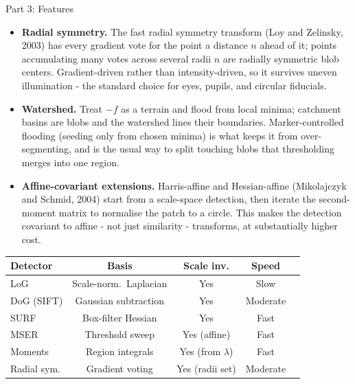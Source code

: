 \documentclass[letterpaper]{article}
\begin{document}
\begin{notes}{Part 3: Features}

\begin{itemize}
    \item \textbf{Radial symmetry.} The fast radial symmetry transform (Loy and Zelinsky, 2003) has every gradient vote for the point a distance $n$ ahead of it; points accumulating many votes across several radii $n$ are radially symmetric blob centers. Gradient-driven rather than intensity-driven, so it survives uneven illumination - the standard choice for eyes, pupils, and circular fiducials.
    \item \textbf{Watershed.} Treat $-f$ as a terrain and flood from local minima; catchment basins are blobs and the watershed lines their boundaries. Marker-controlled flooding (seeding only from chosen minima) is what keeps it from over-segmenting, and is the usual way to split touching blobs that thresholding merges into one region.
    \item \textbf{Affine-covariant extensions.} Harris-affine and Hessian-affine (Mikolajczyk and Schmid, 2004) start from a scale-space detection, then iterate the second-moment matrix to normalise the patch to a circle. This makes the detection covariant to affine - not just similarity - transforms, at substantially higher cost.
\end{itemize}

\begin{center}
\begin{tabular}{@{}lcccc@{}}
\toprule
Detector & Basis & Scale inv. & Speed \\
\midrule
LoG       & Scale-norm.\ Laplacian & Yes & Slow \\
DoG (SIFT) & Gaussian subtraction & Yes & Moderate \\
SURF      & Box-filter Hessian & Yes & Fast \\
MSER      & Threshold sweep & Yes (affine) & Fast \\
Moments   & Region integrals & Yes (from $\lambda$) & Fast \\
Radial sym. & Gradient voting & Yes (radii set) & Moderate \\
\bottomrule
\end{tabular}
\end{center}


\columnbreaknofill







\end{notes}
\end{document}
